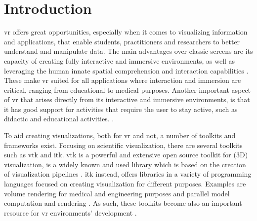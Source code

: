 \chapter{Introduction}
\label{ch:introduction}


\acrfull{vr} offers great opportunities, especially when it comes to visualizing information and applications, that enable students, practitioners and researchers to better understand and manipulate data. The main advantages over classic screens are its capacity of creating fully interactive and immersive environments, as well as leveraging the human innate spatial comprehension and interaction capabilities \cite{belleman_interactive_2003}. These make \acrshort{vr} suited for all applications where interaction and immersion are critical, ranging from educational \cite{hussein_benefits_2015} to medical \cite{faria_benefits_2016, chen_psychological_2009} purposes. Another important aspect of \acrshort{vr} that arises directly from its interactive and immersive environments, is that it has good support for activities that require the user to stay active, such as didactic and educational activities. \cite{hussein_benefits_2015}.

To aid creating visualizations, both for \acrshort{vr} and not, a number of toolkits and frameworks exist. Focusing on scientific visualization, there are several toolkits such as \acrfull{vtk} and \acrfull{itk}. \acrshort{vtk} is a powerful and extensive open source toolkit for (3D) visualization, is a widely known and used library which is based on the creation of visualization pipelines \cite{schroeder_visualization_2006}. \acrshort{itk} \cite{mccormick_itk_2014} instead, offers libraries in a variety of programming languages focused on creating visualization for different purposes. Examples are volume rendering \cite{wheeler_virtual_2018, drebin_volume_1988} for medical and engineering purposes and parallel model computation and rendering \cite{dutra_distributed_2007}. As such, these toolkits become also an important resource for \acrshort{vr} environments' development \cite{wheeler_virtual_2018}.

